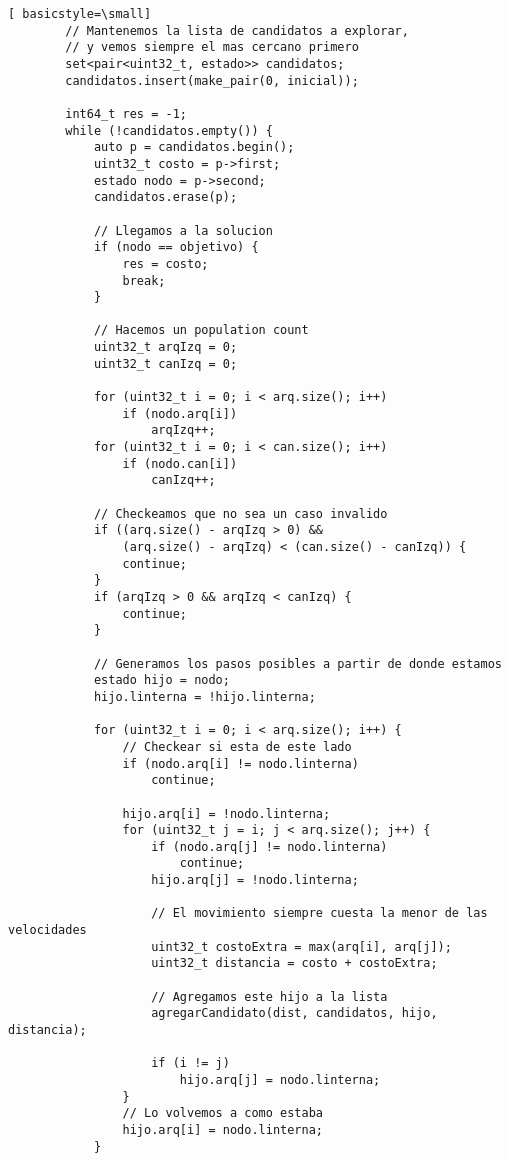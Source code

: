 \begin{lstlisting}[ basicstyle=\small]
        // Mantenemos la lista de candidatos a explorar,
        // y vemos siempre el mas cercano primero
        set<pair<uint32_t, estado>> candidatos;
        candidatos.insert(make_pair(0, inicial));

        int64_t res = -1;
        while (!candidatos.empty()) {
            auto p = candidatos.begin();
            uint32_t costo = p->first;
            estado nodo = p->second;
            candidatos.erase(p);

            // Llegamos a la solucion
            if (nodo == objetivo) {
                res = costo;
                break;
            }

            // Hacemos un population count
            uint32_t arqIzq = 0;
            uint32_t canIzq = 0;

            for (uint32_t i = 0; i < arq.size(); i++)
                if (nodo.arq[i])
                    arqIzq++;
            for (uint32_t i = 0; i < can.size(); i++)
                if (nodo.can[i])
                    canIzq++;

            // Checkeamos que no sea un caso invalido
            if ((arq.size() - arqIzq > 0) &&
                (arq.size() - arqIzq) < (can.size() - canIzq)) {
                continue;
            }
            if (arqIzq > 0 && arqIzq < canIzq) {
                continue;
            }

            // Generamos los pasos posibles a partir de donde estamos
            estado hijo = nodo;
            hijo.linterna = !hijo.linterna;

            for (uint32_t i = 0; i < arq.size(); i++) {
                // Checkear si esta de este lado
                if (nodo.arq[i] != nodo.linterna)
                    continue;

                hijo.arq[i] = !nodo.linterna;
                for (uint32_t j = i; j < arq.size(); j++) {
                    if (nodo.arq[j] != nodo.linterna)
                        continue;
                    hijo.arq[j] = !nodo.linterna;

                    // El movimiento siempre cuesta la menor de las velocidades
                    uint32_t costoExtra = max(arq[i], arq[j]);
                    uint32_t distancia = costo + costoExtra;

                    // Agregamos este hijo a la lista
                    agregarCandidato(dist, candidatos, hijo, distancia);

                    if (i != j)
                        hijo.arq[j] = nodo.linterna;
                }
                // Lo volvemos a como estaba
                hijo.arq[i] = nodo.linterna;
            }


\end{lstlisting}

